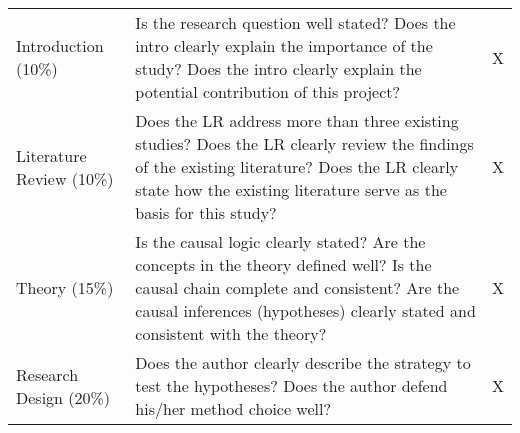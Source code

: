 \documentclass[11pt,]{article}
\theoremstyle{definition}
\theoremstyle{definition}
\theoremstyle{remark}
\begin{document}
\begin{longtable}[]{@{}lll@{}}
\begin{minipage}[t]{0.12\columnwidth}
Introduction (10\%)\strut
\end{minipage} & \begin{minipage}[t]{0.76\columnwidth}\raggedright\strut
Is the research question well stated? Does the intro clearly explain the
importance of the study? Does the intro clearly explain the potential
contribution of this project?\strut
\end{minipage} & \begin{minipage}[t]{0.03\columnwidth}\raggedright\strut
X\strut
\end{minipage}\tabularnewline
\begin{minipage}[t]{0.12\columnwidth}\raggedright\strut
Literature Review (10\%)\strut
\end{minipage} & \begin{minipage}[t]{0.76\columnwidth}\raggedright\strut
Does the LR address more than three existing studies? Does the LR
clearly review the findings of the existing literature? Does the LR
clearly state how the existing literature serve as the basis for this
study?\strut
\end{minipage} & \begin{minipage}[t]{0.03\columnwidth}\raggedright\strut
X\strut
\end{minipage}\tabularnewline
\begin{minipage}[t]{0.12\columnwidth}\raggedright\strut
Theory (15\%)\strut
\end{minipage} & \begin{minipage}[t]{0.76\columnwidth}\raggedright\strut
Is the causal logic clearly stated? Are the concepts in the theory
defined well? Is the causal chain complete and consistent? Are the
causal inferences (hypotheses) clearly stated and consistent with the
theory?\strut
\end{minipage} & \begin{minipage}[t]{0.03\columnwidth}\raggedright\strut
X\strut
\end{minipage}\tabularnewline
\begin{minipage}[t]{0.12\columnwidth}\raggedright\strut
Research Design (20\%)\strut
\end{minipage} & \begin{minipage}[t]{0.76\columnwidth}\raggedright\strut
Does the author clearly describe the strategy to test the hypotheses?
Does the author defend his/her method choice well?\strut
\end{minipage} & \begin{minipage}[t]{0.03\columnwidth}\raggedright\strut
X\strut

\end{minipage}
\end{longtable}
\end{document}
